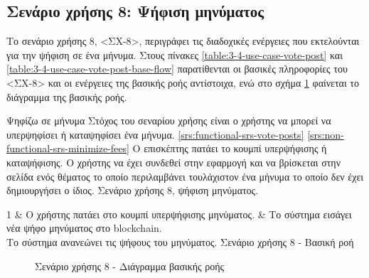 \subsection{Σενάριο χρήσης 8: Ψήφιση μηνύματος} \label{subsection:3-4-use-case-vote-post}

Το σενάριο χρήσης 8, <ΣΧ-8>, περιγράφει τις διαδοχικές ενέργειες που εκτελούνται για την ψήφιση σε ένα μήνυμα. Στους πίνακες \ref{table:3-4-use-case-vote-post} και \ref{table:3-4-use-case-vote-post-base-flow} παρατίθενται οι βασικές πληροφορίες του <ΣΧ-8> και οι ενέργειες της βασικής ροής αντίστοιχα, ενώ στο σχήμα \ref{figure:3-4-use-case-vote-post-base-flow-sequence-diagram} φαίνεται το διάγραμμα της βασικής ροής.

\useCaseTable
{Ψηφίζω σε μήνυμα}
{Στόχος του σεναρίου χρήσης είναι ο χρήστης να μπορεί να υπερψηφίσει ή καταψηφίσει ένα μήνυμα.}
{\ref{srs:functional-srs-vote-posts}}
{\ref{srs:non-functional-srs-minimize-fees}}
{Ο επισκέπτης πατάει το κουμπί υπερψήφισης ή καταψήφισης.}
{Ο χρήστης να έχει συνδεθεί στην εφαρμογή και να βρίσκεται στην σελίδα ενός θέματος το οποίο περιλαμβάνει τουλάχιστον ένα μήνυμα το οποίο δεν έχει δημιουργήσει ο ίδιος.}
{Σενάριο χρήσης 8, ψήφιση μηνύματος.}
{\label{table:3-4-use-case-vote-post}}


\useCaseBaseFlowTable
{
    1 & Ο χρήστης πατάει στο κουμπί υπερψήφισης μηνύματος. & Το σύστημα εισάγει νέα ψήφο μηνύματος στο blockchain. \\ [0.5ex]
}
{Το σύστημα ανανεώνει τις ψήφους του μηνύματος.}
{Σενάριο χρήσης 8 - Βασική ροή}
{\label{table:3-4-use-case-vote-post-base-flow}}

\begin{figure}[H]
    \centering
    
    \caption{Σενάριο χρήσης 8 - Διάγραμμα βασικής ροής}
    \label{figure:3-4-use-case-vote-post-base-flow-sequence-diagram}
\end{figure}
